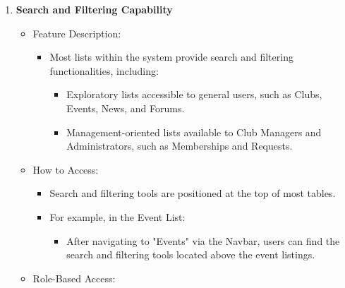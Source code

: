 \begin{enumerate}
\begin{itemize}
        \begin{itemize}
        \item
          System Administrator Only
        \end{itemize}
      \item
        Business Goal:
    
        \begin{itemize}
        \item
          Supports institutional governance and ensures content compliance.
        \end{itemize}
      \end{itemize}
    \item
      \textbf{Search and Filtering Capability}
    
      \begin{itemize}
      \item
        Feature Description:
    
        \begin{itemize}
        \item
          Most lists within the system provide search and filtering
          functionalities, including:
    
          \begin{itemize}
          \item
            Exploratory lists accessible to general users, such as Clubs,
            Events, News, and Forums.
          \item
            Management-oriented lists available to Club Managers and
            Administrators, such as Memberships and Requests.
          \end{itemize}
        \end{itemize}
      \item
        How to Access:
    
        \begin{itemize}
        \item
          Search and filtering tools are positioned at the top of most
          tables.
        \item
          For example, in the Event List:
    
          \begin{itemize}
          \item
            After navigating to "Events" via the Navbar, users can find the
            search and filtering tools located above the event listings.
          \end{itemize}
        \end{itemize}
      \item
        Role-Based Access:
    

\end{itemize}
\end{enumerate}
